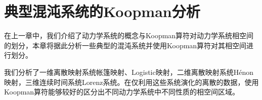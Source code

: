 \chapter{典型混沌系统的Koopman分析}
在上一章中，我们介绍了动力学系统的概念与Koopman算符对动力学系统相空间的划分，本章将据此分析一些典型的混沌系统并使用Koopman算符对其相空间进行划分。

我们分析了一维离散映射系统帐篷映射、Logistic映射，二维离散映射系统H\'{e}non映射，三维连续时间系统Lorenz系统。在仅利用这些系统演化的离散的数据，使用Koopman算符能够较好的区分出不同动力学系统中不同性质的相空间区域。


\clearpage

\clearpage

\clearpage




% 
% 
